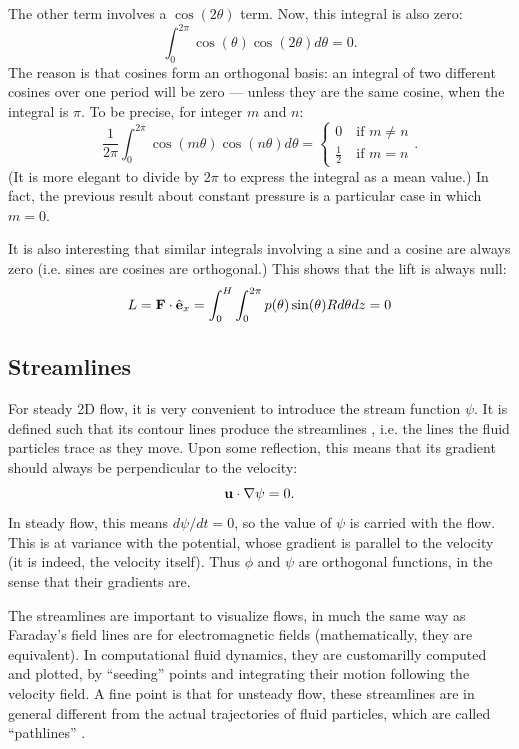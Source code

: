 The other term involves a $\cos(2\theta)$ term. Now, this integral is also
zero:
\[
 \int_0^{2\pi}  \cos(\theta)  \cos(2 \theta) d\theta = 0 .
\]
The reason is that cosines form an
orthogonal basis: an integral of two different cosines over one period
will be zero --- unless they are the same cosine, when the integral is
$\pi$. To be precise, for integer $m$ and $n$:
\[
\frac{1}{2\pi} \int_0^{2\pi}  \cos(m \theta) \cos(n \theta)  d\theta = 
\begin{cases}
0 \quad \text{if } m\ne n \\
\frac12 \quad \text{if } m = n 
\end{cases} .
\]
(It is more elegant to divide by $2\pi$ to express the integral as a
mean value.) In fact, the previous result about constant pressure
is a particular case in which $m=0$.

It is also interesting that similar integrals involving a sine and a
cosine are always zero (i.e. sines are cosines are orthogonal.)
This shows that the lift is always null:
\[
L= \mathbf{F} \cdot \hat{\mathbf{e}}_x = \int_0^H \int_0^{2\pi}
p(\theta) \sin(\theta) R d\theta dz = 0
\]



\subsection{Streamlines}

For steady 2D flow, it is very convenient to introduce the stream
function $\psi$. It is defined such that its contour lines produce the
streamlines , i.e. the lines the fluid particles
trace as they move. Upon some reflection, this means that its gradient
should always be perpendicular to the velocity:
\begin{equation}
  \label{eq:stream_perp_to_u}
  \mathbf{u} \cdot \nabla\psi = 0 .
\end{equation}
In steady flow, this means $d\psi/dt=0$, so the value of $\psi$ is
carried with the flow. This is at variance with the potential, whose
gradient is parallel to the velocity (it is indeed, the velocity
itself). Thus $\phi$ and $\psi$ are orthogonal functions, in the sense
that their gradients are.

The streamlines are important to visualize flows, in much the same way
as Faraday's field lines are for electromagnetic fields
(mathematically, they are equivalent). In computational fluid
dynamics, they are customarilly computed and plotted, by ``seeding''
points and integrating their motion following the velocity field.  A
fine point is that for unsteady flow, these streamlines are in general
different from the actual trajectories of fluid particles, which are
called ``pathlines'' .


